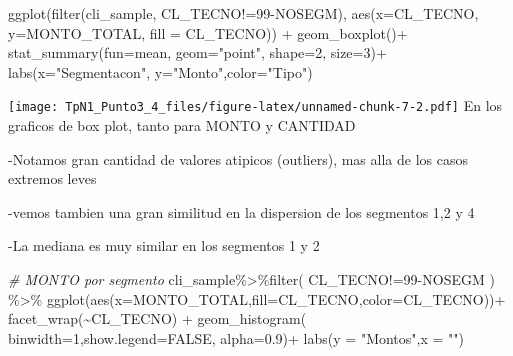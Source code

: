 \documentclass[
]{article}
\newenvironment{Shaded}{\begin{snugshade}}{\end{snugshade}}
\newcommand{\AttributeTok}[1]{\textcolor[rgb]{0.77,0.63,0.00}{#1}}
\newcommand{\CommentTok}[1]{\textcolor[rgb]{0.56,0.35,0.01}{\textit{#1}}}
\newcommand{\ConstantTok}[1]{\textcolor[rgb]{0.00,0.00,0.00}{#1}}
\newcommand{\DecValTok}[1]{\textcolor[rgb]{0.00,0.00,0.81}{#1}}
\newcommand{\FloatTok}[1]{\textcolor[rgb]{0.00,0.00,0.81}{#1}}
\newcommand{\FunctionTok}[1]{\textcolor[rgb]{0.00,0.00,0.00}{#1}}
\newcommand{\NormalTok}[1]{#1}
\newcommand{\SpecialCharTok}[1]{\textcolor[rgb]{0.00,0.00,0.00}{#1}}
\newcommand{\StringTok}[1]{\textcolor[rgb]{0.31,0.60,0.02}{#1}}
\begin{document}
\begin{Shaded}
\begin{Highlighting}[]
\FunctionTok{ggplot}\NormalTok{(}\FunctionTok{filter}\NormalTok{(cli\_sample, CL\_TECNO}\SpecialCharTok{!=}\StringTok{\textquotesingle{}99{-}NOSEGM\textquotesingle{}}\NormalTok{), }\FunctionTok{aes}\NormalTok{(}\AttributeTok{x=}\NormalTok{CL\_TECNO, }\AttributeTok{y=}\NormalTok{MONTO\_TOTAL, }\AttributeTok{fill =}\NormalTok{ CL\_TECNO)) }\SpecialCharTok{+} 
  \FunctionTok{geom\_boxplot}\NormalTok{()}\SpecialCharTok{+}
  \FunctionTok{stat\_summary}\NormalTok{(}\AttributeTok{fun=}\NormalTok{mean, }\AttributeTok{geom=}\StringTok{"point"}\NormalTok{, }\AttributeTok{shape=}\DecValTok{2}\NormalTok{, }\AttributeTok{size=}\DecValTok{3}\NormalTok{)}\SpecialCharTok{+}
  \FunctionTok{labs}\NormalTok{(}\AttributeTok{x=}\StringTok{"Segmentacon"}\NormalTok{,  }\AttributeTok{y=}\StringTok{"Monto"}\NormalTok{,}\AttributeTok{color=}\StringTok{"Tipo"}\NormalTok{)}
\end{Highlighting}
\end{Shaded}

\texttt{[image: TpN1\_Punto3\_4\_files/figure-latex/unnamed-chunk-7-2.pdf]}
En los graficos de box plot, tanto para MONTO y CANTIDAD

-Notamos gran cantidad de valores atipicos (outliers), mas alla de los
casos extremos leves

-vemos tambien una gran similitud en la dispersion de los segmentos 1,2
y 4

-La mediana es muy similar en los segmentos 1 y 2

\begin{Shaded}
\begin{Highlighting}[]
\CommentTok{\# MONTO por segmento}
\NormalTok{cli\_sample}\SpecialCharTok{\%\textgreater{}\%}\FunctionTok{filter}\NormalTok{( CL\_TECNO}\SpecialCharTok{!=}\StringTok{\textquotesingle{}99{-}NOSEGM\textquotesingle{}}\NormalTok{ ) }\SpecialCharTok{\%\textgreater{}\%} 
  \FunctionTok{ggplot}\NormalTok{(}\FunctionTok{aes}\NormalTok{(}\AttributeTok{x=}\NormalTok{MONTO\_TOTAL,}\AttributeTok{fill=}\NormalTok{CL\_TECNO,}\AttributeTok{color=}\NormalTok{CL\_TECNO))}\SpecialCharTok{+}
  \FunctionTok{facet\_wrap}\NormalTok{(}\SpecialCharTok{\textasciitilde{}}\NormalTok{CL\_TECNO) }\SpecialCharTok{+}
  \FunctionTok{geom\_histogram}\NormalTok{( }\AttributeTok{binwidth=}\DecValTok{1}\NormalTok{,}\AttributeTok{show.legend=}\ConstantTok{FALSE}\NormalTok{, }\AttributeTok{alpha=}\FloatTok{0.9}\NormalTok{)}\SpecialCharTok{+}
  \FunctionTok{labs}\NormalTok{(}\AttributeTok{y =} \StringTok{"Montos"}\NormalTok{,}\AttributeTok{x =} \StringTok{""}\NormalTok{)}
\end{Highlighting}
\end{Shaded}
\end{document}
